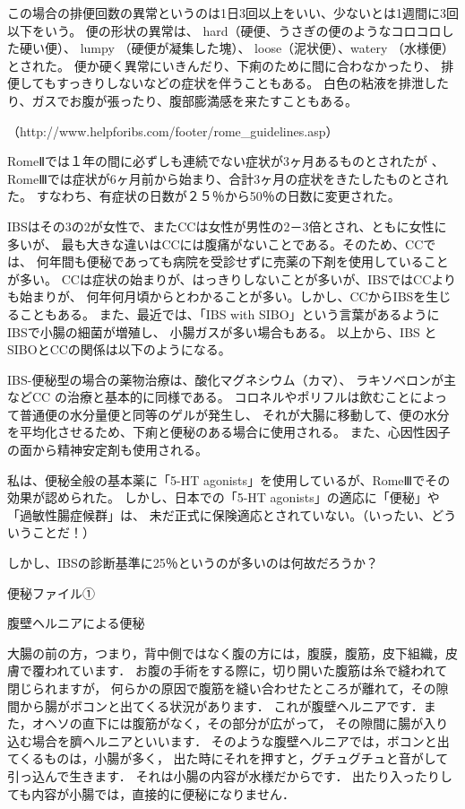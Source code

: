 この場合の排便回数の異常というのは1日3回以上をいい、少ないとは1週間に3回以下をいう。 
便の形状の異常は、 hard（硬便、うさぎの便のようなコロコロした硬い便）、
lumpy （硬便が凝集した塊）、 loose（泥状便）、watery （水様便）とされた。
便か硬く異常にいきんだり、下痢のために間に合わなかったり、
排便してもすっきりしないなどの症状を伴うこともある。
白色の粘液を排泄したり、ガスでお腹が張ったり、腹部膨満感を来たすこともある。


（http://www.helpforibs.com/footer/rome_guidelines.asp） 

RomeⅡでは１年の間に必ずしも連続でない症状が3ヶ月あるものとされたが
、RomeⅢでは症状が6ヶ月前から始まり、合計3ヶ月の症状をきたしたものとされた。
すなわち、有症状の日数が２５％から50％の日数に変更された。 

IBSはその3の2が女性で、またCCは女性が男性の2－3倍とされ、ともに女性に多いが、
最も大きな違いはCCには腹痛がないことである。そのため、CCでは、
何年間も便秘であっても病院を受診せずに売薬の下剤を使用していることが多い。
CCは症状の始まりが、はっきりしないことが多いが、IBSではCCよりも始まりが、
何年何月頃からとわかることが多い。しかし、CCからIBSを生じることもある。
また、最近では、「IBS with SIBO」という言葉があるようにIBSで小腸の細菌が増殖し、
小腸ガスが多い場合もある。 
以上から、IBS と SIBOとCCの関係は以下のようになる。 
	
IBS-便秘型の場合の薬物治療は、酸化マグネシウム（カマ）、
ラキソベロンが主などCC の治療と基本的に同様である。
コロネルやポリフルは飲むことによって普通便の水分量便と同等のゲルが発生し、
それが大腸に移動して、便の水分を平均化させるため、下痢と便秘のある場合に使用される。
また、心因性因子の面から精神安定剤も使用される。 

私は、便秘全般の基本薬に「5-HT agonists」を使用しているが、RomeⅢでその効果が認められた。
しかし、日本での「5-HT agonists」の適応に「便秘」や「過敏性腸症候群」は、
未だ正式に保険適応とされていない。（いったい、どういうことだ！） 

しかし、IBSの診断基準に25％というのが多いのは何故だろうか？

便秘ファイル①

腹壁ヘルニアによる便秘

大腸の前の方，つまり，背中側ではなく腹の方には，腹膜，腹筋，皮下組織，皮膚で覆われています．
お腹の手術をする際に，切り開いた腹筋は糸で縫われて閉じられますが，
何らかの原因で腹筋を縫い合わせたところが離れて，その隙間から腸がボコンと出てくる状況があります．
これが腹壁ヘルニアです．また，オヘソの直下には腹筋がなく，その部分が広がって，
その隙間に腸が入り込む場合を臍ヘルニアといいます．
そのような腹壁ヘルニアでは，ボコンと出てくるものは，小腸が多く，
出た時にそれを押すと，グチュグチュと音がして引っ込んで生きます．
それは小腸の内容が水様だからです． 出たり入ったりしても内容が小腸では，直接的に便秘になりません．

